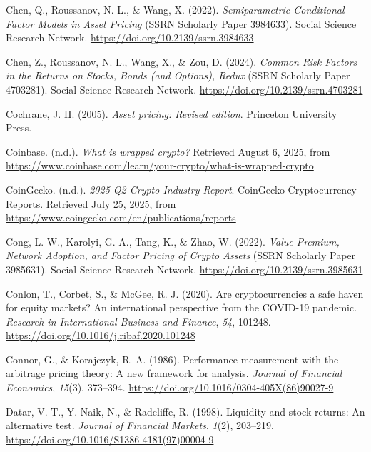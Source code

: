 \documentclass[
  12pt,
  a4paper,
  openany]{scrbook}
\newlength{\cslhangindent}
\newenvironment{CSLReferences}[2] %
 {\begin{list}{}{%
  \setlength{\itemindent}{0pt}
  \setlength{\leftmargin}{0pt}
  \setlength{\parsep}{0pt}
  \ifodd #1
   \setlength{\leftmargin}{\cslhangindent}
   \setlength{\itemindent}{-1\cslhangindent}
  \fi
  \setlength{\itemsep}{#2\baselineskip}}}
 {\end{list}}
\begin{document}
\begin{CSLReferences}{1}{0}
Chen, Q., Roussanov, N. L., \& Wang, X. (2022). \emph{Semiparametric
Conditional Factor Models in Asset Pricing} (SSRN Scholarly Paper
3984633). Social Science Research Network.
\url{https://doi.org/10.2139/ssrn.3984633}

Chen, Z., Roussanov, N. L., Wang, X., \& Zou, D. (2024). \emph{Common
Risk Factors in the Returns on Stocks, Bonds (and Options), Redux} (SSRN
Scholarly Paper 4703281). Social Science Research Network.
\url{https://doi.org/10.2139/ssrn.4703281}

Cochrane, J. H. (2005). \emph{Asset pricing: Revised edition}. Princeton
University Press.

Coinbase. (n.d.). \emph{What is wrapped crypto?} Retrieved August 6,
2025, from
\url{https://www.coinbase.com/learn/your-crypto/what-is-wrapped-crypto}

CoinGecko. (n.d.). \emph{2025 Q2 Crypto Industry Report}. CoinGecko
Cryptocurrency Reports. Retrieved July 25, 2025, from
\url{https://www.coingecko.com/en/publications/reports}

Cong, L. W., Karolyi, G. A., Tang, K., \& Zhao, W. (2022). \emph{Value
Premium, Network Adoption, and Factor Pricing of Crypto Assets} (SSRN
Scholarly Paper 3985631). Social Science Research Network.
\url{https://doi.org/10.2139/ssrn.3985631}

Conlon, T., Corbet, S., \& McGee, R. J. (2020). Are cryptocurrencies a
safe haven for equity markets? An international perspective from the
COVID-19 pandemic. \emph{Research in International Business and
Finance}, \emph{54}, 101248.
\url{https://doi.org/10.1016/j.ribaf.2020.101248}

Connor, G., \& Korajczyk, R. A. (1986). Performance measurement with the
arbitrage pricing theory: A new framework for analysis. \emph{Journal of
Financial Economics}, \emph{15}(3), 373--394.
\url{https://doi.org/10.1016/0304-405X(86)90027-9}

Datar, V. T., Y. Naik, N., \& Radcliffe, R. (1998). Liquidity and stock
returns: An alternative test. \emph{Journal of Financial Markets},
\emph{1}(2), 203--219.
\url{https://doi.org/10.1016/S1386-4181(97)00004-9}


\end{CSLReferences}
\end{document}

